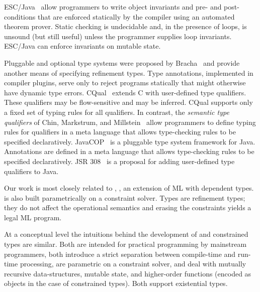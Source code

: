 
ESC/Java~\cite{esc-java}
allow programmers to write object invariants and pre- and
post-conditions that are enforced statically
by the compiler using an automated theorem prover.
Static checking is undecidable and, in the presence of loops,
is unsound (but still useful) unless the programmer supplies loop invariants.
ESC/Java can enforce invariants on mutable state.


Pluggable and optional type systems were proposed by
Bracha~\cite{bracha04-pluggable} and provide another means of
specifying refinement types.
Type annotations, implemented in compiler plugins, serve only to
reject programs statically that might otherwise have dynamic
type errors.
CQual~\cite{foster-popl02} extends C with user-defined type
qualifiers.  These
qualifiers may be flow-sensitive and may be inferred. 
CQual supports only a fixed set of typing rules
for all qualifiers.
In contrast, the {\em semantic type qualifiers} of
Chin, Markstrum, and Millstein~\cite{chin05-qualifiers}
allow programmers to define typing rules for qualifiers
in a meta language that allows type-checking rules to be
specified declaratively.
JavaCOP~\cite{javacop-oopsla06} is a pluggable type system
framework for Java.  Annotations are defined in a meta language
that allows type-checking rules to be specified declaratively.
JSR 308~\cite{jsr308} is a proposal for adding user-defined type qualifiers
to Java.



Our work is most closely related to \DML{}, \cite{xi99dependent}, an
extension of ML with dependent types. \DML{} is also built
parametrically on a constraint solver. Types are refinement types;
they do not affect the operational semantics and erasing the
constraints yields a legal ML program.

At a conceptual level the intuitions behind the development of \DML{}
and constrained types are similar. Both are intended for practical
programming by mainstream programmers, both introduce a strict
separation between compile-time and run-time processing, are
parametric on a constraint solver, and deal with mutually recursive
data-structures, mutable state, and higher-order functions (encoded as
objects in the case of constrained types). Both support existential
types.

